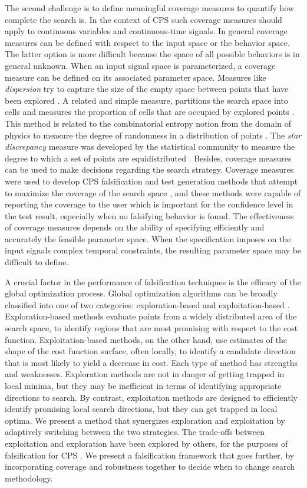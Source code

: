 The second challenge is to define meaningful coverage measures to
quantify how complete the search is. In the context of CPS such
coverage measures should apply to continuous variables and
continuous-time signals. In general coverage measures can be defined
with respect to the input space or the behavior space. The latter
option is more difficult because the space of all possible behaviors
is in general unknown. When an input signal space is parameterized, a
coverage measure can be defined on its associated parameter
space. Measures like \emph{dispersion} try to capture the size of the
empty space between points that have been explored
\cite{Esposito04}. A related and simple measure, partitions the search
space into cells and measures the proportion of cells that are
occupied by explored points \cite{Skruch2011}. This method is related
to the combinatorial entropy notion from the domain of physics to
measure the degree of randomness in a distribution of points
\cite{Gabbay06}. The \emph{star discrepancy} measure was developed by
the statistical community to measure the degree to which a set of
points are equidistributed \cite{Heinrich03}. Besides, coverage
measures can be used to make decisions regarding the search
strategy. Coverage measures were used to develop CPS falsification and
test generation methods that attempt to maximize the coverage of the
search space \cite{DangN09,Dreossi2015,CAV2017}, and these methods
were capable of reporting the coverage to the user which is important
for the confidence level in the test result, especially when no
falsifying behavior is found. The effectiveness of coverage measures
depends on the ability of specifying efficiently and accurately the
feasible parameter space. When the specification imposes on the input
signals complex temporal constraints, the resulting parameter space
may be difficult to define.

A crucial factor in the performance of falsification techniques
is the efficacy of the global optimization process. Global
optimization algorithms can be broadly classified into one of two
categories: exploration-based and exploitation-based \cite{Blum03}.
Exploration-based methods evaluate points from a widely distributed
area of the search space, to identify regions that are most promising
with respect to the cost function. Exploitation-based methods, on the
other hand, use estimates of the shape of the cost function surface,
often locally, to identify a candidate direction that is most likely
to yield a decrease in cost. Each type of method has strengths and
weaknesses. Exploration methods are not in danger of getting trapped
in local minima, but they may be inefficient in terms of identifying
appropriate directions to search.  By contrast, exploitation methods
are designed to efficiently identify promising local search
directions, but they can get trapped in local optima.  We present a
method that synergizes exploration and exploitation by adaptively
switching between the two strategies.  The trade-offs between
exploitation and exploration have been explored by others, for the
purposes of falsification for CPS \cite{Ratschan14}. We present a
falsification framework that goes further, by incorporating coverage
and robustness together to decide when to change search methodology.

